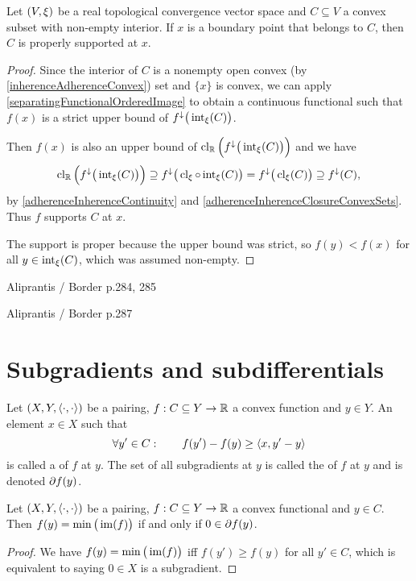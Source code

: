 \begin{proposition} \label{properSupportConvexSets}
Let $\sSet{V,\xi}$ be a real topological convergence vector space and $C\subseteq V$ a convex subset with non-empty interior. If $x$ is a boundary point that belongs to $C$, then $C$ is properly supported at $x$.
\end{proposition}
\begin{proof}
Since the interior of $C$ is a nonempty open convex (by \ref{inherenceAdherenceConvex}) set and $\{x\}$ is convex, we can apply \ref{separatingFunctionalOrderedImage} to obtain a continuous functional such that $f(x)$ is a strict upper bound of $f^\downarrow\big(\operatorname{int}_\xi(C)\big)$.

Then $f(x)$ is also an upper bound of $\operatorname{cl}_{\mathbb{R}}\Big(f^\downarrow\big(\operatorname{int}_\xi(C)\big)\Big)$ and we have
\[ \operatorname{cl}_{\mathbb{R}}\Big(f^\downarrow\big(\operatorname{int}_\xi(C)\big)\Big) \supseteq f^\downarrow\big(\operatorname{cl}_\xi\circ\operatorname{int}_\xi(C)\big) = f^\downarrow\big(\operatorname{cl}_\xi(C)\big) \supseteq f^\downarrow(C), \]
by \ref{adherenceInherenceContinuity} and \ref{adherenceInherenceClosureConvexSets}.
Thus $f$ supports $C$ at $x$.

The support is proper because the upper bound was strict, so $f(y) < f(x)$ for all $y\in \operatorname{int}_\xi(C)$, which was assumed non-empty.
\end{proof}

\begin{theorem}
Aliprantis / Border p.284, 285
\end{theorem}

\begin{theorem}
Aliprantis / Border p.287
\end{theorem}

\section{Subgradients and subdifferentials}
\begin{definition}
Let $\sSet{X,Y,\pair{\cdot,\cdot}}$ be a pairing, $f: C\subseteq Y\to \mathbb{R}$ a convex function and $y\in Y$. An element $x\in X$ such that
\[ \forall y'\in C: \qquad f(y') - f(y) \geq \left\langle x, y'-y \right\rangle  \]
is called a  of $f$ at $y$. The set of all subgradients at $y$ is called the  of $f$ at $y$ and is denoted $\partial f(y)$.
\end{definition}

\begin{lemma}
Let $\sSet{X,Y,\pair{\cdot,\cdot}}$ be a pairing, $f: C\subseteq Y\to \mathbb{R}$ a convex functional and $y\in C$. Then $f(y) = \min\big(\operatorname{im}(f)\big)$ \textup{if and only if} $0\in \partial f(y)$.
\end{lemma}
\begin{proof}
We have $f(y) = \min\big(\operatorname{im}(f)\big)$ iff $f(y')\geq f(y)$ for all $y'\in C$, which is equivalent to saying $0\in X$ is a subgradient.
\end{proof}

